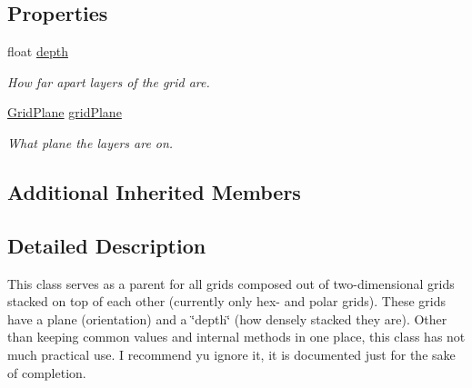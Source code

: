 \subsection*{Properties}
\begin{DoxyCompactItemize}
\item 
float \hyperlink{class_g_f_layered_grid_a3ff168354ca75d04aae2340c48c7070c_a3ff168354ca75d04aae2340c48c7070c}{depth}
\begin{DoxyCompactList}\small\item\em How far apart layers of the grid are.\end{DoxyCompactList}\item 
\hyperlink{namespace_grid_framework_aa55de93079e09bd55c4cb660025820d5_aa55de93079e09bd55c4cb660025820d5}{Grid\+Plane} \hyperlink{class_g_f_layered_grid_aeda8ad1af2b0d4ed12481de40ddb3f55_aeda8ad1af2b0d4ed12481de40ddb3f55}{grid\+Plane}
\begin{DoxyCompactList}\small\item\em What plane the layers are on.\end{DoxyCompactList}\end{DoxyCompactItemize}
\subsection*{Additional Inherited Members}


\subsection{Detailed Description}
This class serves as a parent for all grids composed out of two-\/dimensional grids stacked on top of each other (currently only hex-\/ and polar grids). These grids have a plane (orientation) and a \char`\"{}depth\char`\"{} (how densely stacked they are). Other than keeping common values and internal methods in one place, this class has not much practical use. I recommend yu ignore it, it is documented just for the sake of completion. 

